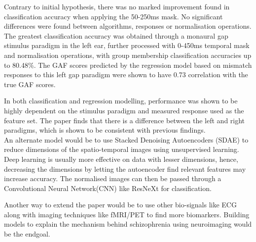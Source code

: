 \documentclass[10pt]{article}
\begin{document}
  Contrary to initial hypothesis, there was no marked improvement found in classification accuracy when applying the 50-250ms mask. No significant differences were found between algorithms, responses or normalisation operations.
  The greatest classification accuracy was obtained through a monaural gap stimulus paradigm in the left ear, further processed with 0-450ms temporal mask and normalisation operations, with group membership classification accuracies up to 80.48\%.
  The GAF scores predicted by the regression model based on mismatch responses to this left gap paradigm were shown to have 0.73 correlation with the true GAF scores.

  In both classification and regression modelling, performance was shown to be highly dependent on the stimulus paradigm and measured response used as the feature set. The paper finds that there is a difference between the left and right paradigms, which is shown to be consistent with previous findings.\\

  An alternate model would be to use Stacked Denoising Autoencoders (SDAE) to reduce dimensions of the spatio-temporal images using unsupervised learning. Deep learning is usually more effective on data with lesser dimensions, hence, decreasing the dimensions by letting the autoencoder find relevant features may increase accuracy. The normalised images can then be passed through a Convolutional Neural Network(CNN) like ResNeXt for classification.

  Another way to extend the paper would be to use other bio-signals like ECG along with imaging techniques like fMRI/PET to find more biomarkers.
  Building models to explain the mechanism behind schizophrenia using neuroimaging would be the endgoal.
\end{document}
